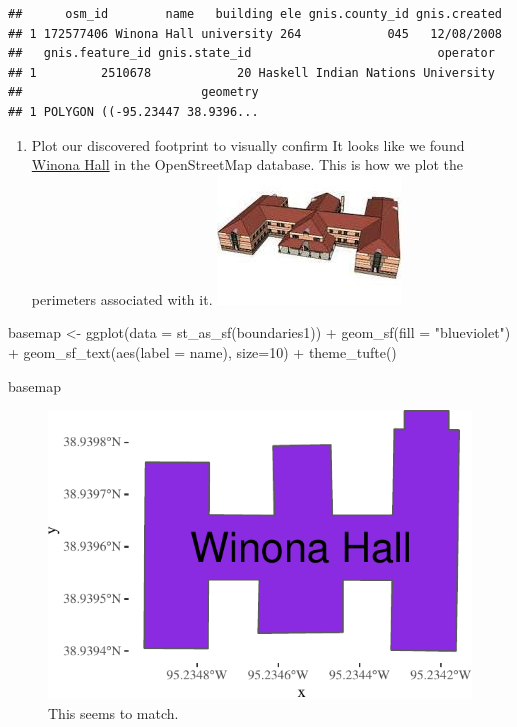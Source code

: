 \documentclass[
  paper=a4,
  ,captions=tableheading
]{scrartcl}
\newenvironment{Shaded}{\begin{snugshade}}{\end{snugshade}}
\newcommand{\AttributeTok}[1]{\textcolor[rgb]{0.77,0.63,0.00}{#1}}
\newcommand{\DecValTok}[1]{\textcolor[rgb]{0.00,0.00,0.81}{#1}}
\newcommand{\FunctionTok}[1]{\textcolor[rgb]{0.00,0.00,0.00}{#1}}
\newcommand{\NormalTok}[1]{#1}
\newcommand{\OtherTok}[1]{\textcolor[rgb]{0.56,0.35,0.01}{#1}}
\newcommand{\SpecialCharTok}[1]{\textcolor[rgb]{0.00,0.00,0.00}{#1}}
\newcommand{\StringTok}[1]{\textcolor[rgb]{0.31,0.60,0.02}{#1}}
\providecommand{\tightlist}{%
  \setlength{\itemsep}{0pt}\setlength{\parskip}{0pt}}
\begin{document}
\begin{verbatim}
##      osm_id        name   building ele gnis.county_id gnis.created
## 1 172577406 Winona Hall university 264            045   12/08/2008
##   gnis.feature_id gnis.state_id                          operator
## 1         2510678            20 Haskell Indian Nations University
##                         geometry
## 1 POLYGON ((-95.23447 38.9396...
\end{verbatim}

\begin{enumerate}
\def\labelenumi{\arabic{enumi}.}
\setcounter{enumi}{3}
\tightlist
\item
  Plot our discovered footprint to visually confirm It looks like we
  found \href{https://www.kansasmemory.org/item/449914}{Winona Hall} in
  the OpenStreetMap database. This is how we plot the perimeters
  associated with it. \includegraphics{winona hall haskell.png}
\end{enumerate}

\begin{Shaded}
\begin{Highlighting}[]
\NormalTok{basemap }\OtherTok{\textless{}{-}} \FunctionTok{ggplot}\NormalTok{(}\AttributeTok{data =} \FunctionTok{st\_as\_sf}\NormalTok{(boundaries1)) }\SpecialCharTok{+}
  \FunctionTok{geom\_sf}\NormalTok{(}\AttributeTok{fill =} \StringTok{"blueviolet"}\NormalTok{) }\SpecialCharTok{+}
  \FunctionTok{geom\_sf\_text}\NormalTok{(}\FunctionTok{aes}\NormalTok{(}\AttributeTok{label =}\NormalTok{ name), }\AttributeTok{size=}\DecValTok{10}\NormalTok{) }\SpecialCharTok{+}
  \FunctionTok{theme\_tufte}\NormalTok{()}

\NormalTok{basemap}
\end{Highlighting}
\end{Shaded}

\begin{figure}
\centering
\includegraphics{Haskell_files/figure-latex/unnamed-chunk-9-1.pdf}
\caption{This seems to match.}
\end{figure}
\end{document}
